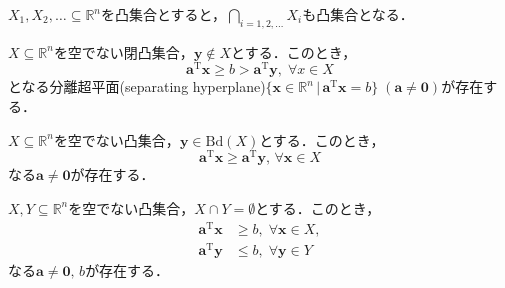 \documentclass{jsreport}
\begin{document}
\begin{lemm}\label{lemm:convex}
  $X_1, X_2, \ldots \subseteq \mathbb{R}^n$を凸集合とすると，$\bigcap \limits_{i = 1, 2, \ldots} X_i$も凸集合となる．
\end{lemm}

\begin{lemm}[分離超平面の存在]\label{lemm:hyperplane1}
  $X \subseteq \mathbb{R}^n$を空でない閉凸集合，$\bm{y} \notin X$とする．このとき，
  \begin{equation}
    \bm{a}^{\mathrm{T}}\bm{x} \geq b > \bm{a}^{\mathrm{T}}\bm{y}, \; \forall x \in X \nonumber
  \end{equation}
  となる分離超平面(separating hyperplane)$\{\bm{x} \in \mathbb{R}^n \, | \, \bm{a}^{\mathrm{T}} \bm{x} = b\} \; (\bm{a} \neq \bm{0})$が存在する．
\end{lemm}


\begin{lemm}\label{lemm:hyperplane2}
  $X \subseteq \mathbb{R}^n$を空でない凸集合，$\bm{y} \in \mathrm{Bd}(X)$とする．このとき，
  \begin{equation}
    \bm{a}^{\mathrm{T}} \bm{x} \geq \bm{a}^{\mathrm{T}} \bm{y}, \, \forall \bm{x} \in X \nonumber
  \end{equation}
  なる$\bm{a} \neq \bm{0}$が存在する．
\end{lemm}

\begin{lemm}\label{lemm:hyperplane3}
  $X, Y \subseteq \mathbb{R}^n$を空でない凸集合，$X \cap Y = \emptyset$とする．このとき，
  \begin{align}
    \bm{a}^{\mathrm{T}}\bm{x} &\geq b, \; \forall \bm{x} \in X, \nonumber \\
    \bm{a}^{\mathrm{T}}\bm{y} &\leq b, \; \forall \bm{y} \in Y \nonumber
  \end{align}
  なる$\bm{a} \neq \bm{0}, \, b$が存在する．
\end{lemm}
\end{document}
